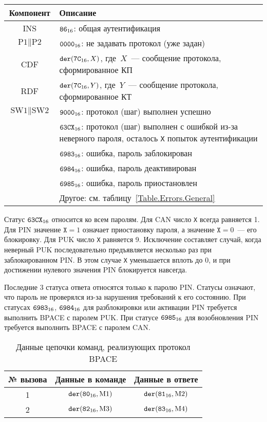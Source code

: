 \begin{table}[H]
\caption{}\label{Table.Oper.GABPACECmd}
\begin{tabular}{|c|p{14cm}|}
\hline
Компонент & 	Описание \\
\hline
\hline
INS & $\texttt{86}_{16}$: общая аутентификация \\
\hline
$\text{P1} \parallel \text{P2}$ & $\texttt{0000}_{16}$: не задавать протокол (уже задан)\\ 
\hline
CDF & $\texttt{der}(\texttt{7C}_{16}, X)$, 
где~$X$~--- сообщение протокола, сформированное КП\\ 
\hline 
\hline
RDF & $\texttt{der}(\texttt{7C}_{16}, Y)$, где~$Y$~--- 
сообщение протокола, сформированное КТ\\
\hline
$\text{SW1} \parallel \text{SW2}$ & 
$\texttt{9000}_{16}$: протокол (шаг) выполнен успешно\\
\cline{2-2}
& $\texttt{63CX}_{16}$: протокол (шаг) выполнен с ошибкой из-за 
неверного пароля, осталось \texttt{X} попыток аутентификации\\
\cline{2-2}
& $\texttt{6983}_{16}$: ошибка, пароль заблокирован\\
\cline{2-2}
& $\texttt{6984}_{16}$: ошибка, пароль деактивирован\\
\cline{2-2}
& $\texttt{6985}_{16}$: ошибка, пароль приостановлен\\
\cline{2-2}
& Другое: см. таблицу~\ref{Table.Errors.General} \\
\hline
\end{tabular}
\end{table}

Статус $\texttt{63CX}_{16}$ относится ко всем паролям.
%
Для CAN число \texttt{X} всегда равняется 1.
%
Для PIN значение $\texttt{X}=1$ означает приостановку пароля,
а значение $\texttt{X}=0$~--- его блокировку.
%
Для PUK число \texttt{X} равняется 9.
Исключение составляет случай, когда неверный PUK 
последовательно предъявляется несколько раз при заблокированном PIN.
В этом случае \texttt{X} уменьшается вплоть до 0,
и при достижении нулевого значения PIN блокируется навсегда.

Последние 3 статуса ответа относятся только к паролю PIN.
Статусы означают, что пароль не проверялся из-за нарушения 
требований к его состоянию. При статусах $\texttt{6983}_{16}$, $\texttt{6984}_{16}$ для 
разблокировки или активации PIN требуется выполнить BPACE с паролем PUK. При 
статусе $\texttt{6985}_{16}$ для возобновления PIN требуется выполнить BPACE с паролем CAN. 

\begin{table}[H]
\caption{Данные цепочки команд, реализующих протокол BPACE}
\label{Table.Oper.BPACE}
\begin{tabular}{|c|c|c|}
\hline
№ вызова & Данные в команде & Данные в ответе\\
\hline
\hline
1 & $\texttt{der}(\texttt{80}_{16}, \text{M1})$ & 
$\texttt{der}(\texttt{81}_{16}, \text{M2})$\\
\hline
2 & $\texttt{der}(\texttt{82}_{16}, \text{M3})$ & 
$\texttt{der}(\texttt{83}_{16}, \text{M4})$\\
\hline
\end{tabular}
\end{table}

